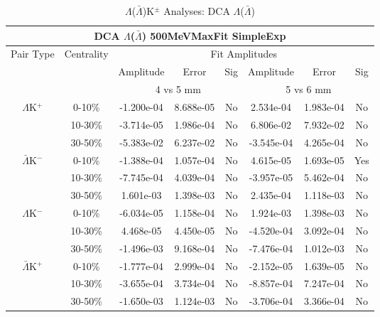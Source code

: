 \documentclass[../AnalysisNoteJBuxton.tex]{subfiles}
\begin{document}
\begin{table}
 \centering
 \begin{tabular}{|c|c|c|c|c||c|c|c|}
  \multicolumn{8}{c}{DCA $\Lambda$($\bar{\Lambda}$) 500MeVMaxFit SimpleExp} \\
  \hline
  \multirow{3}{*}{Pair Type} & \multirow{3}{*}{Centrality} & \multicolumn{6}{c|}{Fit Amplitudes} \\
  \cline{3-8}
   & & Amplitude & Error & Sig & Amplitude & Error & Sig \\  
  \cline{3-8}
   & & \multicolumn{3}{c||}{4 vs 5 mm} & \multicolumn{3}{c|}{5 vs 6 mm} \\  
  \hline
  \multirow{3}{*}{$\Lambda$K$^{+}$}
   &  0-10\% & -1.200e-04 & 8.688e-05 & No & 2.534e-04 & 1.983e-04 & No \\
   & 10-30\% & -3.714e-05 & 1.986e-04 & No & 6.806e-02 & 7.932e-02 & No \\
   & 30-50\% & -5.383e-02 & 6.237e-02 & No & -3.545e-04 & 4.265e-04 & No \\
  \hline
  \multirow{3}{*}{$\bar{\Lambda}$K$^{-}$}
   &  0-10\% & -1.388e-04 & 1.057e-04 & No & 4.615e-05 & 1.693e-05 & Yes \\
   & 10-30\% & -7.745e-04 & 4.039e-04 & No & -3.957e-05 & 5.462e-04 & No \\
   & 30-50\% & 1.601e-03 & 1.398e-03 & No & 2.435e-04 & 1.118e-03 & No \\
  \hline \hline
  \multirow{3}{*}{$\Lambda$K$^{-}$}
   &  0-10\% & -6.034e-05 & 1.158e-04 & No & 1.924e-03 & 1.398e-03 & No \\
   & 10-30\% & 4.468e-05 & 4.450e-05 & No & -4.520e-04 & 3.092e-04 & No \\
   & 30-50\% & -1.496e-03 & 9.168e-04 & No & -7.476e-04 & 1.012e-03 & No \\
  \hline
  \multirow{3}{*}{$\bar{\Lambda}$K$^{+}$}
   &  0-10\% & -1.777e-04 & 2.999e-04 & No & -2.152e-05 & 1.639e-05 & No \\
   & 10-30\% & -3.655e-04 & 3.734e-04 & No & -8.857e-04 & 7.247e-04 & No \\
   & 30-50\% & -1.650e-03 & 1.124e-03 & No & -3.706e-04 & 3.366e-04 & No \\
  \hline
 \end{tabular}
 \caption{$\Lambda$($\bar{\Lambda}$)K$^{\pm}$ Analyses: DCA $\Lambda$($\bar{\Lambda}$)}
 \label{tab:V0DcaLamKch_500MeVMaxFit_SimpleExp}
\end{table}



\clearpage
\end{document}
